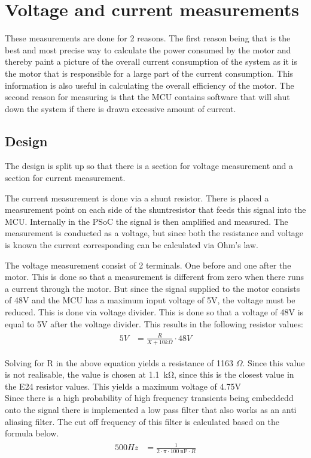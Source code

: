\newpage
\section{Voltage and current measurements}
\label{sec:measurements}
These measurements are done for 2 reasons. The first reason being that is the best and most precise way to calculate the power consumed by the motor and thereby paint a picture of the overall current consumption of the system as it is the motor that is responsible for a large part of the current consumption. This information is also useful in calculating the overall efficiency of the motor. The second reason for measuring is that the MCU contains software that will shut down the system if there is drawn excessive amount of current. 

\subsection{Design}
The design is split up so that there is a section for voltage measurement and a section for current measurement.

The current measurement is done via a shunt resistor. There is placed a measurement point on each side of the shuntresistor that feeds this signal into the MCU. Internally in the PSoC the signal is then amplified and measured. The measurement is conducted as a voltage, but since both the resistance and voltage is known the current corresponding can be calculated via Ohm's law.

The voltage measurement consist of 2 terminals. One before and one after the motor. This is done so that a measurement is different from zero when there runs a current through the motor. But since the signal supplied to the motor consists of 48V and the MCU has a maximum input voltage of 5V, the voltage must be reduced. This is done via voltage divider. This is done so that a voltage of 48V is equal to 5V after the voltage divider. This results in the following resistor values:
\begin{align}
	\begin{split}
		5V &= \frac{R}{X+10k\Omega} \cdot 48V
	\end{split}
\end{align}

Solving for R in the above equation yields a resistance of 1163 $\Omega$. Since this value is not realisable, the value is chosen at \SI{1.1}{\kilo \ohm}, since this is the closest value in the E24 resistor values. This yields a maximum voltage of 4.75V \\
Since there is a high probability of high frequency transients being embeddedd onto the signal there is implemented a low pass filter that also works as an anti aliasing filter. The cut off frequency of this filter is calculated based on the formula below.
\begin{align}
	\begin{split}
		500Hz &= \frac{1}{2 \cdot \pi \cdot \SI{100}{\nano \farad} \cdot R} 
	\end{split}
\end{align}

